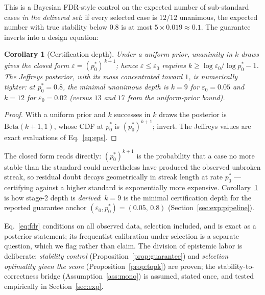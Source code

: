 \documentclass[11pt]{article}
\newtheorem{corollary}{Corollary}
\newcommand{\Betadist}{\mathrm{Beta}}
\begin{document}
This is a Bayesian FDR-style control on the expected number of
sub-standard cases \emph{in the delivered set}: if every selected case
is $12/12$ unanimous, the expected number with true stability below
$0.8$ is at most $5 \times 0.019 \approx 0.1$. The guarantee inverts
into a design equation:

\begin{corollary}[Certification depth]
\label{cor:depth}
Under a uniform prior, unanimity in $k$ draws gives the closed form
$\varepsilon = (p_0^{\ast})^{\,k+1}$; hence $\varepsilon \le
\varepsilon_0$ requires $k \ge \log \varepsilon_0 / \log p_0^{\ast} -
1$. The Jeffreys posterior, with its mass concentrated toward $1$, is
numerically tighter: at $p_0^{\ast} = 0.8$, the minimal unanimous depth
is $k = 9$ for $\varepsilon_0 = 0.05$ and $k = 12$ for $\varepsilon_0 =
0.02$ (versus $13$ and $17$ from the uniform-prior bound).
\end{corollary}

\begin{proof}
With a uniform prior and $k$ successes in $k$ draws the posterior is
$\Betadist(k+1, 1)$, whose CDF at $p_0^{\ast}$ is
$(p_0^{\ast})^{k+1}$; invert. The Jeffreys values are exact evaluations
of Eq.~\eqref{eq:eps}.
\end{proof}

The closed form reads directly: $(p_0^{\ast})^{k+1}$ is the probability
that a case no more stable than the standard could nevertheless have
produced the observed unbroken streak, so residual doubt decays
geometrically in streak length at rate $p_0^{\ast}$ --- certifying
against a higher standard is exponentially more expensive.
Corollary~\ref{cor:depth} is how stage-2 depth is \emph{derived}: $k =
9$ is the minimal certification depth for the reported guarantee anchor
$(\varepsilon_0, p_0^{\ast}) = (0.05,\, 0.8)$
(Section~\ref{sec:exp:pipeline}).

Eq.~\eqref{eq:fdr} conditions on all observed data, selection included,
and is exact as a posterior statement; its frequentist calibration
under selection is a separate question, which we flag rather than
claim. The division of epistemic labor is deliberate: \emph{stability
control} (Proposition~\ref{prop:guarantee}) and \emph{selection
optimality given the score} (Proposition~\ref{prop:topk}) are proven;
the stability-to-correctness bridge (Assumption~\ref{ass:mono}) is
assumed, stated once, and tested empirically in Section~\ref{sec:exp}.

\end{document}
